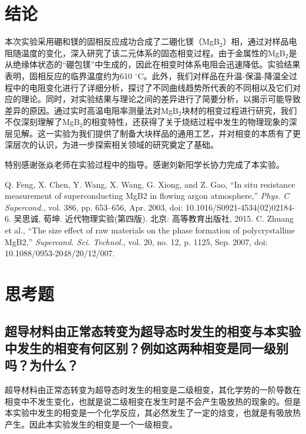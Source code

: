 \documentclass[font=default]{mpltx}
\begin{document}
\section{结论}
本次实验采用硼和镁的固相反应成功合成了二硼化镁（MgB$_2$）相，通过对样品电阻随温度的变化，深入研究了该二元体系的固态相变过程。由于金属性的MgB$_2$是从绝缘体状态的“硼包镁”中生成的，因此在相变时体系电阻会迅速降低。实验结果表明，固相反应的临界温度约为610 $^\circ$C。此外，我们对样品在升温-保温-降温全过程中的电阻变化进行了详细分析，探讨了不同曲线趋势所代表的不同相以及它们对应的理论。同时，对实验结果与理论之间的差异进行了简要分析，以揭示可能导致差异的原因。通过实时高温电阻率测量法对MgB$_2$块材的相变过程进行研究，我们不仅深刻理解了MgB$_2$的相变特性，还获得了关于烧结过程中发生的物理现象的深层见解。这一实验为我们提供了制备大块样品的通用工艺，并对相变的本质有了更深层次的认识，为进一步探索相关领域的研究奠定了基础。

\begin{acknowledgments}
特别感谢张焱老师在实验过程中的指导。感谢刘新阳学长协力完成了本实验。
\end{acknowledgments}

\begin{thebibliography}{}
   Q. Feng, X. Chen, Y. Wang, X. Wang, G. Xiong, and Z. Gao, “In situ resistance measurement of superconducting MgB2 in flowing argon atmosphere,” \textit{Phys. C Supercond.}, vol. 386, pp. 653–656, Apr. 2003, doi: 10.1016/S0921-4534(02)02184-6.
   吴思诚, 荀坤. 近代物理实验(第四版). 北京: 高等教育出版社, 2015.
   C. Zhuang et al., “The size effect of raw materials on the phase formation of polycrystalline MgB2,” \textit{Supercond. Sci. Technol.}, vol. 20, no. 12, p. 1125, Sep. 2007, doi: 10.1088/0953-2048/20/12/007.
\end{thebibliography}
  
\clearpage %
\appendix %
\section{思考题}
\subsection{超导材料由正常态转变为超导态时发生的相变与本实验中发生的相变有何区别？例如这两种相变是同一级别吗？为什么？}
超导材料由正常态转变为超导态时发生的相变是二级相变，其化学势的一阶导数在相变中不发生变化，也就是说二级相变在发生时是不会产生吸放热的现象的。但是本实验中发生的相变是一个化学反应，其必然发生了一定的焓变，也就是有吸放热产生。因此本实验发生的相变是一个一级相变。
\end{document}
